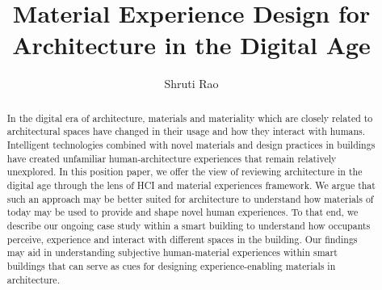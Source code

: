 \documentclass[manuscript, anonymous, review]{acmart}
\begin{document}
\title{Material Experience Design for Architecture in the Digital Age}

\author{Shruti Rao}


\renewcommand{\shortauthors}{Rao et al.}

\begin{abstract}

In the digital era of architecture, materials and materiality which are closely related to architectural spaces have changed in their usage and how they interact with humans. Intelligent technologies combined with novel materials and design practices in buildings have created unfamiliar human-architecture experiences that remain relatively unexplored. In this position paper, we offer the view of reviewing architecture in the digital age through the lens of HCI and material experiences framework. We argue that such an approach may be better suited for architecture to understand how materials of today may be used to provide and shape novel human experiences. To that end, we describe our ongoing case study within a smart building to understand how occupants perceive, experience and interact with different spaces in the building. Our findings may aid in understanding subjective human-material experiences within smart buildings that can serve as cues for designing experience-enabling materials in architecture.
\end{abstract}

\end{document}
